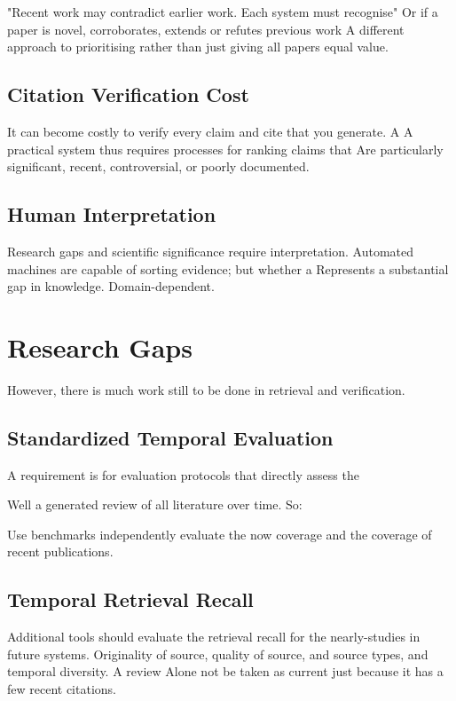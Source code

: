 \documentclass[acmsmall,screen]{acmart}
\begin{document}
"Recent work may contradict earlier work. Each system must recognise"
Or if a paper is novel, corroborates, extends or refutes previous work
A different approach to prioritising rather than just giving all papers equal value.

\subsection{Citation Verification Cost}

It can become costly to verify every claim and cite that you generate. A
A practical system thus requires processes for ranking claims that
Are particularly significant, recent, controversial, or poorly documented.

\subsection{Human Interpretation}

Research gaps and scientific significance require interpretation.
Automated machines are capable of sorting evidence; but whether a
Represents a substantial gap in knowledge.
Domain-dependent.

\section{Research Gaps}

However, there is much work still to be done in retrieval and verification.

\subsection{Standardized Temporal Evaluation}

A requirement is for evaluation protocols that directly assess the

Well a generated review of all literature over time. So:

Use benchmarks independently evaluate the now coverage and the coverage
of recent publications.

\subsection{Temporal Retrieval Recall}

Additional tools should evaluate the retrieval recall for the nearly-studies in future systems.
Originality of source, quality of source, and source types, and temporal diversity. A review
Alone not be taken as current just because it has a few
recent citations.
\end{document}
